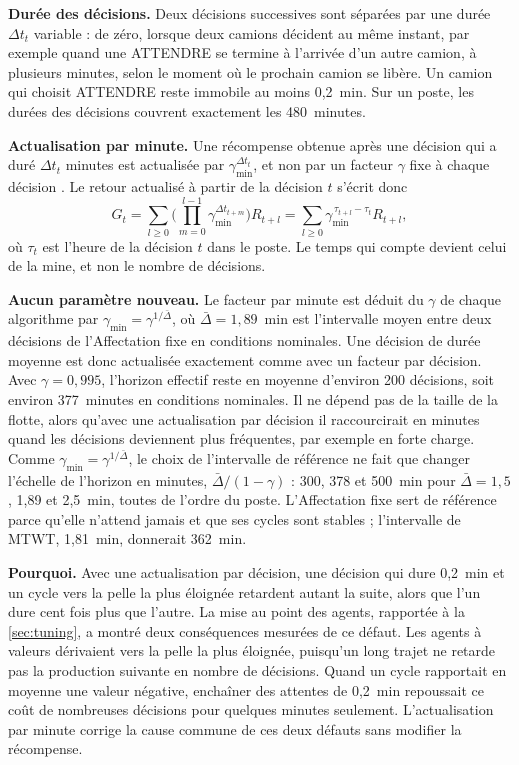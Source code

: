 \documentclass[11pt,a4paper]{article}
\newif\ifrevmarks
\newcommand{\revtag}[1]{\ifrevmarks\textsuperscript{\textcolor{red!70!black}{\scriptsize[#1]}}\fi}
\newenvironment{revbloc}[1]{\par\ifrevmarks\color{revcolor}\noindent\revtag{#1}\ \fi}{\par}
\newif\ifcorrmarks
\newcommand{\corr}[1]{\ifcorrmarks\textcolor{corrcolor}{#1}\else#1\fi}
\begin{document}
\begin{revbloc}{M9, v3}
\textbf{Durée des décisions.} Deux décisions successives sont séparées par une durée $\Delta t_t$ variable : \corr{de zéro, lorsque deux camions décident au même instant, par exemple quand une ATTENDRE se termine à l'arrivée d'un autre camion, à plusieurs minutes,} selon le moment où le prochain camion se libère. \corr{Un camion qui choisit ATTENDRE reste immobile au moins 0,2~min.} Sur un poste, les durées des décisions couvrent exactement les 480~minutes.

\textbf{Actualisation par minute.} Une récompense obtenue après une décision qui a duré $\Delta t_t$ minutes est actualisée par $\gamma_{\min}^{\Delta t_t}$, et non par un facteur $\gamma$ fixe à chaque décision \cite{BradtkeDuff1995, SuttonPrecupSingh1999}. Le retour actualisé à partir de la décision $t$ s'écrit donc
\begin{equation}
G_t = \sum_{l \geq 0} \Big( \prod_{m=0}^{l-1} \gamma_{\min}^{\Delta t_{t+m}} \Big) R_{t+l}
    = \sum_{l \geq 0} \gamma_{\min}^{\,\tau_{t+l} - \tau_t} R_{t+l} ,
\label{eq:smdp-return}
\end{equation}
où $\tau_t$ est l'heure de la décision $t$ dans le poste. Le temps qui compte devient celui de la mine, et non le nombre de décisions.

\textbf{Aucun paramètre nouveau.} Le facteur par minute est déduit du $\gamma$ de chaque algorithme par $\gamma_{\min} = \gamma^{1/\bar{\Delta}}$, où $\bar{\Delta} = 1{,}89$~min est l'intervalle moyen entre deux décisions de l'Affectation fixe en conditions nominales. Une décision de durée moyenne est donc actualisée exactement comme avec un facteur par décision. Avec $\gamma = 0{,}995$, l'horizon effectif reste en moyenne d'environ 200 décisions, soit environ 377~minutes en conditions nominales. Il ne dépend pas de la taille de la flotte, alors qu'avec une actualisation par décision il raccourcirait en minutes quand les décisions deviennent plus fréquentes, par exemple en forte charge. \corr{Comme $\gamma_{\min} = \gamma^{1/\bar\Delta}$, le choix de l'intervalle de référence ne fait que changer l'échelle de l'horizon en minutes, $\bar\Delta/(1-\gamma)$ : 300, 378 et 500~min pour $\bar\Delta = 1{,}5$, 1,89 et 2,5~min, toutes de l'ordre du poste. L'Affectation fixe sert de référence parce qu'elle n'attend jamais et que ses cycles sont stables ; l'intervalle de MTWT, 1,81~min, donnerait 362~min.}

\textbf{Pourquoi.} Avec une actualisation par décision, une décision qui dure 0,2~min et un cycle vers la pelle la plus éloignée retardent autant la suite, alors que l'un dure cent fois plus que l'autre. La mise au point des agents, rapportée à la \cref{sec:tuning}, a montré deux conséquences mesurées de ce défaut. Les agents à valeurs dérivaient vers la pelle la plus éloignée, puisqu'un long trajet ne retarde pas la production suivante en nombre de décisions. Quand un cycle rapportait en moyenne une valeur négative, enchaîner des attentes de 0,2~min repoussait ce coût de nombreuses décisions pour quelques minutes seulement. L'actualisation par minute corrige la cause commune de ces deux défauts sans modifier la récompense.


\end{revbloc}
\end{document}

